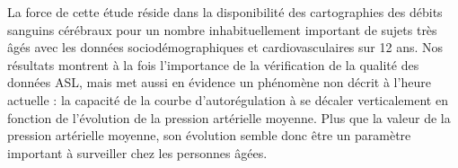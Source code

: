 La force de cette étude réside dans la disponibilité des cartographies des débits sanguins
cérébraux pour un nombre inhabituellement important de sujets très âgés avec les données
sociodémographiques et cardiovasculaires sur 12 ans. Nos résultats montrent à la fois l’importance de
la vérification de la qualité des données ASL, mais met aussi en évidence un phénomène non décrit à
l’heure actuelle : la capacité de la courbe d’autorégulation à se décaler verticalement en fonction de l’évolution de la pression artérielle moyenne. Plus que la valeur de la pression artérielle moyenne, son
évolution semble donc être un paramètre important à surveiller chez les personnes âgées.

































{}
